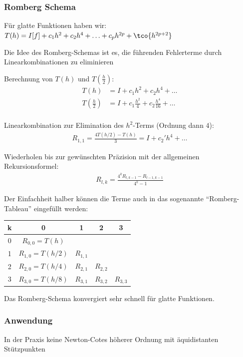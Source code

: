 \subsubsection{Romberg Schema}
Für glatte Funktionen haben wir: $T (h) = I [f] + c_1 h^2 + c_2 h^4 + \ldots + c_p h^{2p} + \tco{h^{2p+2}}$

Die Idee des Romberg-Schemas ist es, die führenden Fehlerterme durch Linearkombinationen zu eliminieren

 Berechnung von $T(h)$ und $T(\frac{h}{2})$:
\rmvspace
\begin{align*}
    T(h) & = I + c_1 h^2 + c_2 h^4 + \ldots \\
    T\left( \frac{h}{2} \right) & = I + c_1 \frac{h^2}{4} + c_2 \frac{h^4}{16} + \ldots \\
\end{align*}

\drmvspace
{} Linearkombination zur Elimination des $h^2$-Terms (Ordnung dann $4$):
\rmvspace
\begin{align*}
    R_{1, 1} = \frac{4 T(h / 2) - T(h)}{3} = I + c_2' h^4 + \ldots
\end{align*}

\drmvspace
{} Wiederholen bis zur gewünschten Präzision mit der allgemeinen Rekursionsformel:
\rmvspace
\begin{align*}
    R_{l, k} = \frac{4^k R_{l, k - 1} - R_{l - 1, k - 1}}{4^k - 1}
\end{align*}

\drmvspace
Der Einfachheit halber können die Terme auch in das sogenannte ``Romberg-Tableau'' eingefüllt werden:
\begin{table}[h!]
    \begin{center}
        \begin{tabular}[c]{c|cccc}
            k & 0 & 1 & 2 & 3\\
            \hline
            0 & $R_{0, 0} = T(h)$ \\
            1 & $R_{1, 0} = T(h / 2)$ & $R_{1, 1}$ \\
            2 & $R_{2, 0} = T(h / 4)$ & $R_{2, 1}$ & $R_{2, 2}$ \\
            3 & $R_{3, 0} = T(h / 8)$ & $R_{3, 1}$ & $R_{3, 2}$ & $R_{3, 3}$ \\
        \end{tabular}
    \end{center}
\end{table}
Das Romberg-Schema konvergiert sehr schnell für glatte Funktionen.


\subsubsection{Anwendung}
In der Praxis keine Newton-Cotes höherer Ordnung mit äquidistanten Stützpunkten
